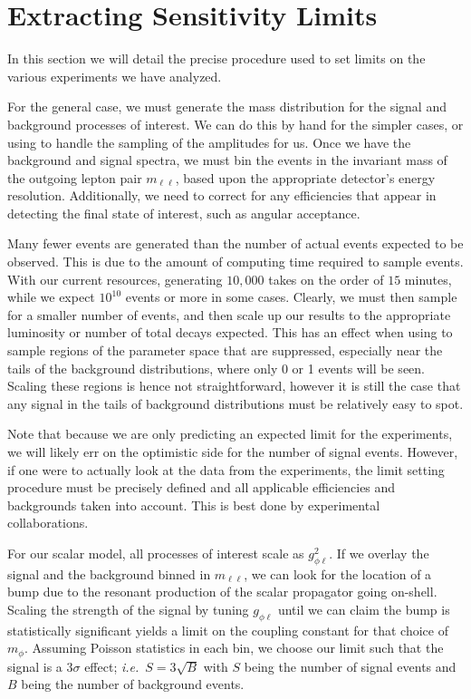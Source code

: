 \section{Extracting Sensitivity Limits}
\label{sec:limit_procedure}
In this section we will detail the precise procedure used to set limits on the various experiments we have analyzed.

For the general case, we must generate the mass distribution for the signal and background processes of interest.
We can do this by hand for the simpler cases, or using \madgraph to handle the sampling of the amplitudes for us.
Once we have the background and signal spectra, we must bin the events in the invariant mass of the outgoing lepton pair $m_{\ell\ell}$, based upon the appropriate detector's energy resolution.
Additionally, we need to correct for any efficiencies that appear in detecting the final state of interest, such as angular acceptance.

Many fewer events are generated than the number of actual events expected to be observed.
This is due to the amount of computing time required to sample events.
With our current resources, generating $10,000$ takes on the order of $15$ minutes, while we expect $10^{10}$ events or more in some cases.
Clearly, we must then sample for a smaller number of events, and then scale up our results to the appropriate luminosity or number of total decays expected.
This has an effect when using \madgraph to sample regions of the parameter space that are suppressed, especially near the tails of the background distributions, where only 0 or 1 events will be seen.
Scaling these regions is hence not straightforward, however it is still the case that any signal in the tails of background distributions must be relatively easy to spot.

Note that because we are only predicting an expected limit for the experiments, we will likely err on the optimistic side for the number of signal events.
However, if one were to actually look at the data from the experiments, the limit setting procedure must be precisely defined and all applicable efficiencies and backgrounds taken into account.
This is best done by experimental collaborations.

For our scalar model, all processes of interest scale as $g_{\phi\ell}^2$.
If we overlay the signal and the background binned in $m_{\ell\ell}$, we can look for the location of a bump due to the resonant production of the scalar propagator going on-shell.
Scaling the strength of the signal by tuning $g_{\phi\ell}$ until we can claim the bump is statistically significant yields a limit on the coupling constant for that choice of $m_\phi$.
Assuming Poisson statistics in each bin, we choose our limit such that the signal is a $3\sigma$ effect; {\em i.e.}\ $S = 3\sqrt{B}$ with $S$ being the number of signal events and $B$ being the number of background events.

